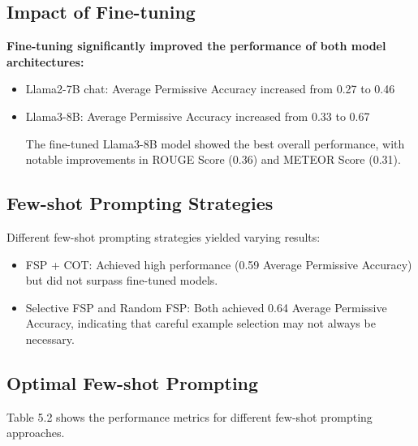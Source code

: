 \documentclass[logo,msc]{infthesis}           %
\begin{document}
\subsection{Impact of Fine-tuning}
\textbf{Fine-tuning significantly improved the performance of both model architectures:}
\begin{itemize}

\item Llama2-7B chat: Average Permissive Accuracy increased from 0.27 to 0.46
\item Llama3-8B: Average Permissive Accuracy increased from 0.33 to 0.67

The fine-tuned Llama3-8B model showed the best overall performance, with notable improvements in ROUGE Score (0.36) and METEOR Score (0.31).
\end{itemize}

\subsection{Few-shot Prompting Strategies}
Different few-shot prompting strategies yielded varying results:
\begin{itemize}

\item FSP + COT: Achieved high performance (0.59 Average Permissive Accuracy) but did not surpass fine-tuned models.
\item Selective FSP and Random FSP: Both achieved 0.64 Average Permissive Accuracy, indicating that careful example selection may not always be necessary.
\end{itemize}

\subsection{Optimal Few-shot Prompting}
Table 5.2 shows the performance metrics for different few-shot prompting approaches.
\begin{table}[h!]
\centering
\caption{Performance Metrics for Different Few Shot Prompting}
\label{tab:performance_metrics}
\end{table}
\end{document}
